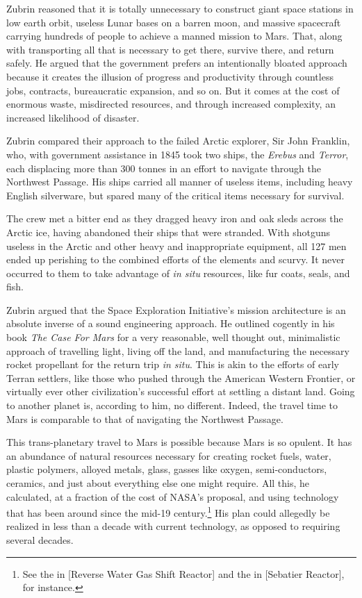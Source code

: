 Zubrin reasoned that it is totally unnecessary to construct giant space stations in low earth orbit, useless Lunar bases on a barren moon, and massive spacecraft carrying hundreds of people to achieve a manned mission to Mars. That, along with transporting all that is necessary to get there, survive there, and return safely. He argued that the government prefers an intentionally bloated approach because it creates the illusion of progress and productivity through countless jobs, contracts, bureaucratic expansion, and so on. But it comes at the cost of enormous waste, misdirected resources, and through increased complexity, an increased likelihood of disaster.

Zubrin compared their approach to the failed Arctic explorer, Sir John Franklin, who, with government assistance in 1845 took two ships, the {\it Erebus} and {\it Terror}, each displacing more than 300 tonnes in an effort to navigate through the Northwest Passage. His ships carried all manner of useless items, including heavy English silverware, but spared many of the critical items necessary for survival. 

The crew met a bitter end as they dragged heavy iron and oak sleds across the Arctic ice, having abandoned their ships that were stranded. With shotguns useless in the Arctic and other heavy and inappropriate equipment, all 127 men ended up perishing to the combined efforts of the elements and scurvy. It never occurred to them to take advantage of {\it in situ} resources, like fur coats, seals, and fish.

Zubrin argued that the Space Exploration Initiative's mission architecture is an absolute inverse of a sound engineering approach. He outlined cogently in his book {\it The Case For Mars} for a very reasonable, well thought out, minimalistic approach of travelling light, living off the land, and manufacturing the necessary rocket propellant for the return trip {\it in situ}. This is akin to the efforts of early Terran settlers, like those who pushed through the American Western Frontier, or virtually ever other civilization's successful effort at settling a distant land. Going to another planet is, according to him, no different. Indeed, the travel time to Mars is comparable to that of navigating the Northwest Passage.

This trans-planetary travel to Mars is possible because Mars is so opulent. It has an abundance of natural resources necessary for creating rocket fuels, water, plastic polymers, alloyed metals, glass, gasses like oxygen, semi-conductors, ceramics, and just about everything else one might require. All this, he calculated, at a fraction of the cost of NASA's proposal, and using technology that has been around since the mid-19 century.\footnote{See the  in [Reverse Water Gas Shift Reactor] and the  in [Sebatier Reactor], for instance.} His plan could allegedly be realized in less than a decade with current technology, as opposed to requiring several decades.

